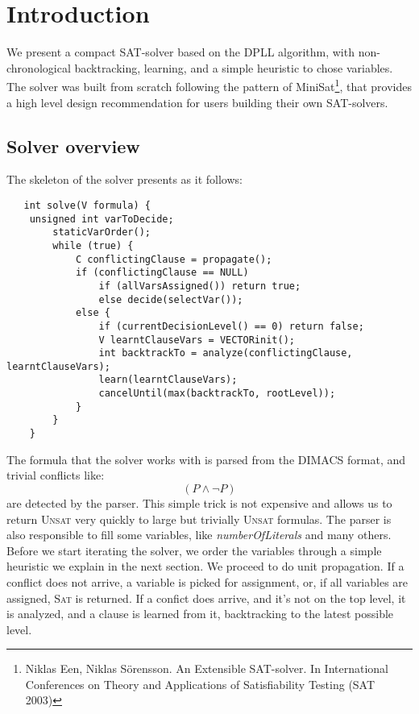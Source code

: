 


  
  \section{Introduction}
  
  We present a compact SAT-solver based on the DPLL algorithm, with non-chronological backtracking, learning, and a simple heuristic to chose variables. The solver was built from scratch following the pattern of MiniSat\footnote{Niklas Een, Niklas Sörensson. An Extensible SAT-solver. In International Conferences on Theory and Applications of Satisfiability Testing (SAT 2003)}, that provides a high level design recommendation for users building their own SAT-solvers.\\
  
  \subsection{Solver overview}
   The skeleton of the solver presents as it follows: \\
   \begin{lstlisting}
   int solve(V formula) {
   	unsigned int varToDecide;
    	staticVarOrder();
    	while (true) {
        	C conflictingClause = propagate();
        	if (conflictingClause == NULL)
            	if (allVarsAssigned()) return true; 
                else decide(selectVar());	
        	else {
            	if (currentDecisionLevel() == 0) return false;
            	V learntClauseVars = VECTORinit();
            	int backtrackTo = analyze(conflictingClause, learntClauseVars);
            	learn(learntClauseVars);
            	cancelUntil(max(backtrackTo, rootLevel));
        	}
    	}
	}
	\end{lstlisting}
    The formula that the solver works with is parsed from the DIMACS format, and trivial conflicts like: \[ (P \wedge \neg{P}) \]  are detected by the parser. This simple trick is not expensive and allows us to return \textsc{Unsat} very quickly to large but trivially \textsc{Unsat} formulas. The parser is also responsible to fill some variables, like \textit{numberOfLiterals} and many others. \\
    Before we start iterating the solver, we order the variables through a simple heuristic we explain in the next section. We proceed to do unit propagation. If a conflict does not arrive, a variable is picked for assignment, or, if all variables are assigned, \textsc{Sat} is returned. If a confict does arrive, and it's not on the top level, it is analyzed, and a clause is learned from it, backtracking to the latest possible level. \\
    
